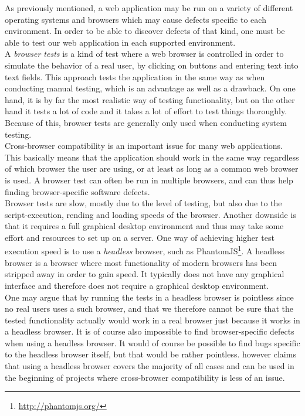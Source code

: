 As previously mentioned, a web application may be run on a variety of
different operating systems and browsers which may cause defects
specific to each environment. In order to be able to discover defects of
that kind, one must be able to test our web application in each
supported environment.\\

A \emph{browser tests} is a kind of test where a web browser is
controlled in order to simulate the behavior of a real user, by clicking
on buttons and entering text into text fields. This approach tests the
application in the same way as when conducting manual testing, which is
an advantage as well as a drawback. On one hand, it is by far the most
realistic way of testing functionality, but on the other hand it tests a
lot of code and it takes a lot of effort to test things thoroughly.
Because of this, browser tests are generally only used when conducting
system testing.\\

Cross-browser compatibility is an important issue for many web
applications. This basically means that the application should work in
the same way regardless of which browser the user are using, or at least
as long as a common web browser is used. A browser test can often be run
in multiple browsers, and can thus help finding browser-specific
software defects.\\

Browser tests are slow, mostly due to the level of testing, but also due
to the script-execution, rending and loading speeds of the browser.
Another downside is that it requires a full graphical desktop
environment and thus may take some effort and resources to set up on a
server. One way of achieving higher test execution speed is to use a
\emph{headless} browser, such as
PhantomJS\footnote{\url{http://phantomjs.org/}}. A headless browser is a
browser where most functionality of modern browsers has been stripped
away in order to gain speed. It typically does not have any graphical
interface and therefore does not require a graphical desktop
environment. \cite{web:headless}\\

One may argue that by running the tests in a headless browser is
pointless since no real users uses a such browser, and that we therefore
cannot be sure that the tested functionality actually would work in a
real browser just because it works in a headless browser. It is of
course also impossible to find browser-specific defects when using  a
headless browser. It would of course be possible to find bugs specific
to the headless browser itself, but that would be rather pointless.
\citet{web:headless} however claims that using a headless browser covers
the majority of all cases and can be used in the beginning of projects
where cross-browser compatibility is less of an issue.\\

